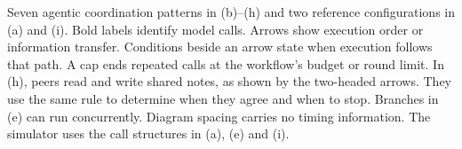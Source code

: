 \caption{Seven agentic coordination patterns in (b)--(h) and two reference
configurations in (a) and (i). Bold labels identify model calls. Arrows show
execution order or information transfer. Conditions beside an arrow state
when execution follows that path. A cap ends repeated calls at the workflow's
budget or round limit. In (h), peers read and write shared notes, as shown by
the two-headed arrows. They use the same rule to determine when they agree
and when to stop. Branches in (e) can run concurrently. Diagram spacing
carries no timing information. The simulator uses the call structures in
(a), (e) and (i).}
